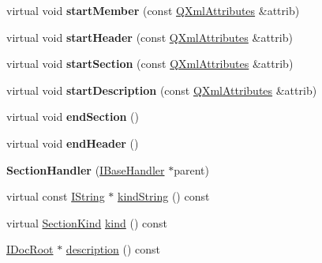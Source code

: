 \begin{DoxyCompactItemize}
\item 
\mbox{\label{class_section_handler_a374859f7b4173fc7235f44a7693bbc84}} 
virtual void {\bfseries start\+Member} (const \mbox{\hyperlink{class_q_xml_attributes}{Q\+Xml\+Attributes}} \&attrib)
\item 
\mbox{\label{class_section_handler_a73659b9a7ce539c23823063f4e9c45c7}} 
virtual void {\bfseries start\+Header} (const \mbox{\hyperlink{class_q_xml_attributes}{Q\+Xml\+Attributes}} \&attrib)
\item 
\mbox{\label{class_section_handler_a4bda4ed37671bca76ea6daaee5e547e7}} 
virtual void {\bfseries start\+Section} (const \mbox{\hyperlink{class_q_xml_attributes}{Q\+Xml\+Attributes}} \&attrib)
\item 
\mbox{\label{class_section_handler_a5e29cb4d5c08687775be196114fc4e77}} 
virtual void {\bfseries start\+Description} (const \mbox{\hyperlink{class_q_xml_attributes}{Q\+Xml\+Attributes}} \&attrib)
\item 
\mbox{\label{class_section_handler_a0a5405315b9ae91a7f69cb1b20cd3432}} 
virtual void {\bfseries end\+Section} ()
\item 
\mbox{\label{class_section_handler_ae04c5b7b1759156aa51ac0e6a040b86d}} 
virtual void {\bfseries end\+Header} ()
\item 
\mbox{\label{class_section_handler_a5cf144be479a68bd12a6ccfc3d102583}} 
{\bfseries Section\+Handler} (\mbox{\hyperlink{class_i_base_handler}{I\+Base\+Handler}} $\ast$parent)
\item 
virtual const \mbox{\hyperlink{class_i_string}{I\+String}} $\ast$ \mbox{\hyperlink{class_section_handler_a6f0ce72df9dc0d56ba8b20fb6684fdc9}{kind\+String}} () const
\item 
virtual \mbox{\hyperlink{class_i_section_af768cbfe7056fadbd0a67d26d0ef84e5}{Section\+Kind}} \mbox{\hyperlink{class_section_handler_a09b0046032fbbb4189c2d5dd016475b8}{kind}} () const
\item 
\mbox{\hyperlink{class_i_doc_root}{I\+Doc\+Root}} $\ast$ \mbox{\hyperlink{class_section_handler_a447ecf6bce811a3f12be5e90510aa880}{description}} () const

\end{DoxyCompactItemize}
